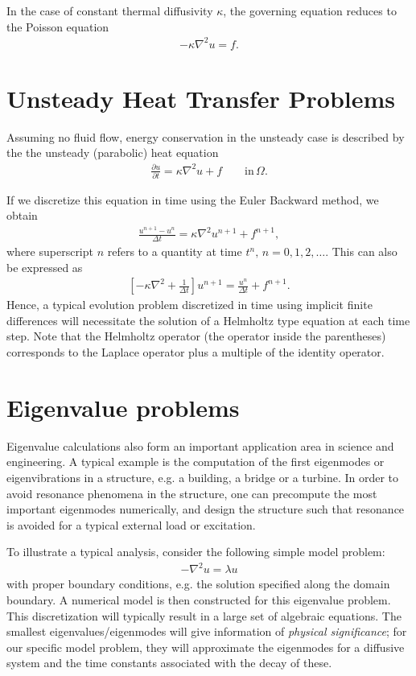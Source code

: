 In the case of constant thermal diffusivity $\kappa$, the governing equation
reduces to the Poisson equation
\begin{align}
  \label{steady-heat}
  - \kappa\nabla^2 u = f.
\end{align}

\section {Unsteady Heat Transfer Problems}

Assuming no fluid flow, energy conservation in the unsteady case is described by
the the unsteady (parabolic) heat equation
\begin{align}
  \label{heat-eq}
  \frac{\partial u}{\partial t}
  = \kappa \nabla^2 u + f \qquad \text{in}\,\Omega.
\end{align}

If we discretize this equation in time using the Euler Backward method, we
obtain
\begin{align}
  \frac{u^{n+1}- u^n}{\Delta t}
  = \kappa\nabla^2 u^{n+1} + f^{n+1},
\end{align}
where superscript $n$ refers to a quantity at time $t^n,\, n=0,1,2,\ldots$. This
can also be expressed as
\begin{align}
  \label{helm-eq}
  \left[- \kappa\nabla^2 +\frac{1}{\Delta t} \right] u^{n+1} =
  \frac{u^n}{\Delta t} + f^{n+1}.
\end{align}
Hence, a typical evolution problem discretized in time using implicit finite
differences will necessitate the solution of a Helmholtz type equation at each
time step. Note that the Helmholtz operator (the operator inside the
parentheses) corresponds to the Laplace operator plus a multiple of the identity
operator.

\section{Eigenvalue problems}

Eigenvalue calculations also form an important application area in science and
engineering. A typical example is the computation of the first eigenmodes or
eigenvibrations in a structure, e.g. a building, a bridge or a turbine. In
order to avoid resonance phenomena in the structure, one can precompute the most
important eigenmodes numerically, and design the structure such that resonance
is avoided for a typical external load or excitation.

To illustrate a typical analysis, consider the following simple model problem:
\begin{align*}
  -\nabla^2 u = \lambda u
\end{align*}
with proper boundary conditions, e.g. the solution specified along the domain
boundary. A numerical model is then constructed for this eigenvalue problem.
This discretization will typically result in a large set of algebraic equations.
The smallest eigenvalues/eigenmodes will give information of \emph{physical
significance}; for our specific model problem, they will approximate the
eigenmodes for a diffusive system and the time constants associated with the
decay of these.

